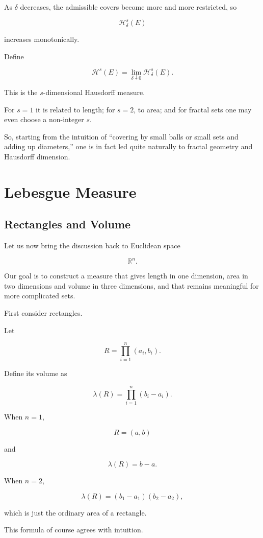 \documentclass[11pt]{article}
\begin{document}
As $\delta$ decreases, the admissible covers become more and more restricted, so

\[
\mathcal{H}^{s}_{\delta}(E)
\]

increases monotonically.

Define

\[
\mathcal{H}^{s}(E)=\lim_{\delta\downarrow0}\mathcal{H}^{s}_{\delta}(E).
\]

This is the $s$-dimensional Hausdorff measure.

For $s=1$ it is related to length; for $s=2$, to area; and for fractal sets one may even choose a non-integer $s$.

So, starting from the intuition of ``covering by small balls or small sets and adding up diameters,'' one is in fact led quite naturally to fractal geometry and Hausdorff dimension.

\section{Lebesgue Measure}

\subsection{Rectangles and Volume}

Let us now bring the discussion back to Euclidean space

\[
\mathbb{R}^{n}.
\]

Our goal is to construct a measure that gives length in one dimension, area in two dimensions and volume in three dimensions, and that remains meaningful for more complicated sets.

First consider rectangles.

Let

\[
R=\prod_{i=1}^{n}(a_{i},b_{i}).
\]

Define its volume as

\[
\lambda(R)=\prod_{i=1}^{n}(b_{i}-a_{i}).
\]

When $n=1$,

\[
R=(a,b)
\]

and

\[
\lambda(R)=b-a.
\]

When $n=2$,

\[
\lambda(R)=(b_{1}-a_{1})(b_{2}-a_{2}),
\]

which is just the ordinary area of a rectangle.

This formula of course agrees with intuition.
\end{document}
